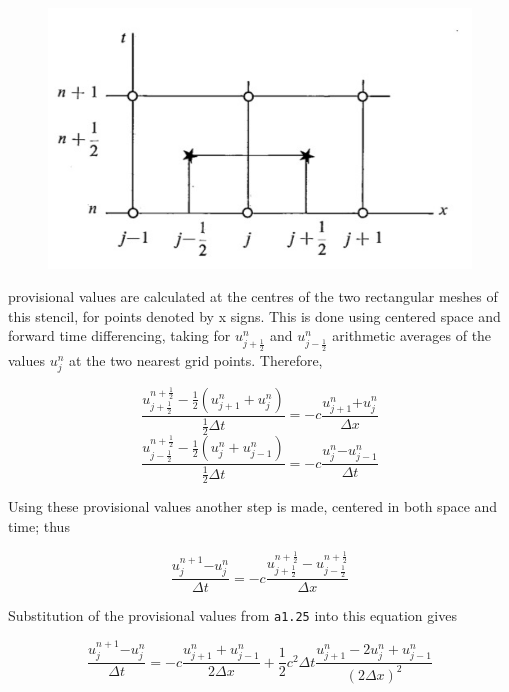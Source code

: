 \begin{figure}
 \centering
 \includegraphics[width = .7 \textwidth]{figs/NM/pic11.jpg}
 \caption{} \label{fig:}
\end{figure}

provisional values are calculated at the centres of the two rectangular
meshes of this stencil, for points denoted by x signs. This is done
using centered space and forward time differencing, taking for
\(u_{j + \frac{1}{2}}^{n}\) and \(u_{j - \frac{1}{2}}^{n}\) arithmetic
averages of the values \(u_{j}^{n}\) at the two nearest grid points.
Therefore,

 \[\frac{u_{j + \frac{1}{2}}^{n + \frac{1}{2}} - \frac{1}{2}\left( u_{j + 1}^{n} + u_{j}^{n} \right)}
{\frac{1}{2}\Delta t} = - c \frac{u_{j + 1}^{n}{+ u}_{j}^{n}}{\Delta x}\]\[\frac{u_{j - \frac{1}{2}}^{n + \frac{1}{2}} - \frac{1}{2}\left( u_{j}^{n} + u_{j - 1}^{n} \right)}{\frac{1}{2}\Delta t} = - c \frac{u_{j}^{n}{- u}_{j - 1}^{n}}{\Delta t}\]

Using these provisional values another step is made, centered in both
space and time; thus

 \[\frac{u_{j}^{n + 1}{- u}_{j}^{n}}{\Delta t} =
- c \frac{u_{j + \frac{1}{2}}^{n + \frac{1}{2}} - u_{j - \frac{1}{2}}^{n + \frac{1}{2}}}{\Delta x}\]

Substitution of the provisional values from \texttt{a1.25} into this
equation gives

 \[\frac{u_{j}^{n + 1}{- u}_{j}^{n}}{\Delta t} =
- c\frac{u_{j + 1}^{n} + u_{j - 1}^{n}}{2\Delta x} +
\frac{1}{2}c^{2}\Delta t\frac{u_{j + 1}^{n} - 2u_{j}^{n} + u_{j - 1}^{n}}
{\left( 2\Delta x \right)^{2}}\]

